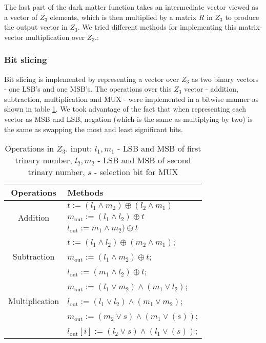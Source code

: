The last part of the dark matter function takes an intermediate vector viewed as a vector of $Z_3$ elements, which is then multiplied 
by a matrix $R$ in $Z_3$ to produce the output vector in $Z_3$. We tried different methods for implementing this matrix-vector multiplication over $Z_3$.:	

\subsubsection{Bit slicing} Bit slicing is implemented  by representing a vector over $Z_3$  as two binary vectors - one LSB's and one MSB's. The operations over this $Z_3$ vector - addition, subtraction, multiplication and MUX  - were implemented in a bitwise manner as shown in table \ref{tab:multicol}. We took advantage of the fact that when representing each vector as MSB and LSB, negation (which is the same as multiplying by two) is the same as swapping the most and least significant bits. 





\begin{table}[ht]
	\caption{Operations in $Z_3$. input:   ${l_1}, {m_1}$ - LSB and MSB  of first trinary number, 
		${l_2}, {m_2}$ - LSB and MSB  of second trinary number,  ${s}$ - selection bit for MUX}
	\begin{center}
		\begin{tabular}{|c|l|}
			\hline
			\textbf{Operations} & \textbf{Methods}\\
			\hline
			\multirow{3}{*}{Addition} & ${t} := ({l_1 \wedge m_2}) \oplus ({l_2 \wedge m_1})$\\
			& $m_{\mathrm{out}} := ( l_1 \wedge  l_2 ) \oplus  t $ \\
			& $l_{\mathrm{out}} :=m_1 \wedge m_2 ) \oplus t $ \\
			\hline
			\multirow{3}{*}{Subtraction} & ${t} := ({l_1} \wedge {l_2}) \oplus ({m_2} \wedge {m_1})$;\\
			& $m_{\mathrm{out}} := (l_1 \wedge m_2 ) \oplus t$;\\
			& $l_{\mathrm{out}} := (m_1 \wedge l_2 ) \oplus t$; \\
			\hline
			\multirow{3}{*}{Multiplication} & $m_{\mathrm{out}}:= (l_1 \vee m_2) \wedge   (m_1 \vee l_2)$; \\
			& $l_{\mathrm{out}} := (l_1 \vee l_2) \wedge     (m_1 \vee m_2)$;\\
			\hline
			\multirow{3}{*}{MUX} & $m_{\mathrm{out}} :=( m_2 \vee s) \wedge (m_1 \vee (\bar{s}) )$; \\
			& $l_{\mathrm{out}}[i] :=( l_2 \vee s) \wedge (l_1 \vee (\bar{s}) )$; \\
			\hline
			
		\end{tabular}
	\end{center}
	\label{tab:multicol}
\end{table}


